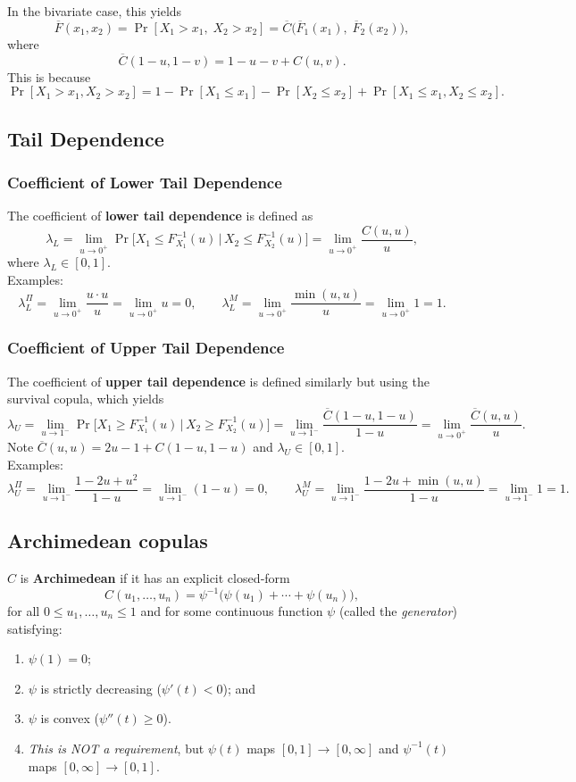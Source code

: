 \documentclass[11pt]{article}
\newcommand{\noi}{\noindent}
\begin{document}
\noi In the bivariate case, this yields
\[
\overline{F}(x_1,x_2)
=\Pr[X_1>x_1,\;X_2>x_2]
=\overline{C}\bigl(\overline{F}_1(x_1),\;\overline{F}_2(x_2)\bigr),
\]
where
\[
\overline{C}(1-u,1-v)=1-u-v+C(u,v).
\]
This is because
\[
\Pr[X_1>x_1,X_2>x_2]
=1-\Pr[X_1\le x_1]-\Pr[X_2\le x_2]
+\Pr[X_1\le x_1,X_2\le x_2].
\]

\subsection{Tail Dependence}
\subsubsection{Coefficient of Lower Tail Dependence}
\noi The coefficient of \textbf{lower tail dependence} is defined as
\[
\lambda_L
=\lim_{u\to0^+}
\Pr\bigl[X_1 \le F_{X_1}^{-1}(u)\,\big|\,X_2 \le F_{X_2}^{-1}(u)\bigr]
=\lim_{u\to0^+}\frac{C(u,u)}{u},
\]
\noi where $\lambda_L\in[0,1]$.\\

\noi Examples:
\[
\lambda_L^{\Pi}
=\lim_{u\to0^+}\frac{u\cdot u}{u}
=\lim_{u\to0^+}u=0,
\qquad
\lambda_L^{M}
=\lim_{u\to0^+}\frac{\min(u,u)}{u}
=\lim_{u\to0^+}1=1.
\]

\subsubsection{Coefficient of Upper Tail Dependence}
\noi The coefficient of \textbf{upper tail dependence} is defined similarly but using the survival copula, which yields
\[
\lambda_U
=\lim_{u\to1^-}
\Pr\bigl[X_1\ge F_{X_1}^{-1}(u)\,\big|\,X_2\ge F_{X_2}^{-1}(u)\bigr]
=\lim_{u\to1^-}\frac{\overline{C}(1-u,1-u)}{1-u}
=\lim_{u\to0^+}\frac{\overline{C}(u,u)}{u}.
\]
\noi Note $\overline{C}(u,u)=2u-1+C(1-u,1-u)$ and $\lambda_U\in[0,1]$.\\
\noi Examples:
\[
\lambda_U^{\Pi}
=\lim_{u\to1^-}\frac{1-2u+u^2}{1-u}
=\lim_{u\to1^-}(1-u)=0,
\qquad
\lambda_U^{M}
=\lim_{u\to1^-}\frac{1-2u+\min(u,u)}{1-u}
=\lim_{u\to1^-}1=1.
\]

\subsection{Archimedean copulas}
\noi $C$ is \textbf{Archimedean} if it has an explicit closed‐form
\[
C(u_1,\dots,u_n)
=\psi^{-1}\bigl(\psi(u_1)+\cdots+\psi(u_n)\bigr),
\]
for all $0\le u_1,\dots,u_n\le1$ and for some continuous function $\psi$ (called the \emph{generator}) satisfying:
\begin{enumerate}
    \item $\psi(1)=0$;
    \item $\psi$ is strictly decreasing ($\psi'(t) < 0$); and
    \item $\psi$ is convex ($\psi''(t) \geq 0$).
    \item \textit{This is NOT a requirement}, but $\psi(t)$ maps $[0,1] \rightarrow [0,\infty]$ and $\psi^{-1}(t)$ maps $[0, \infty] \rightarrow [0,1]$.
\end{enumerate} \phantom{i}
\end{document}
